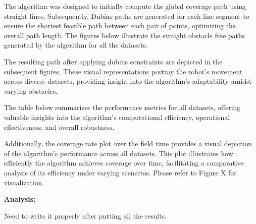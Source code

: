 \vspace*{6mm} 

The algorithm was designed to initially compute the global coverage path using straight lines. Subsequently, Dubins paths are generated for each line segment to ensure the shortest feasible path between each pair of points, optimizing the overall path length. The figures below illustrate the straight obstacle free paths generated by the algorithm for all the datasets.


\vspace*{6mm}

The resulting path after applying dubins constraints are depicted in the subsequent figures. These visual representations portray the robot's movement across diverse datasets, providing insight into the algorithm's adaptability amidst varying obstacles. 

\vspace*{6mm}  

The table below summarizes the performance metrics for all datasets, offering valuable insights into the algorithm's computational efficiency, operational effectiveness, and overall robustness.

\vspace*{6mm}

Additionally, the coverage rate plot over the field time provides a visual depiction of the algorithm's performance across all datasets. This plot illustrates how efficiently the algorithm achieves coverage over time, facilitating a comparative analysis of its efficiency under varying scenarios. Please refer to Figure X for visualization.

\textbf{Analysis: }

Need to write it properly after putting all the results.  
